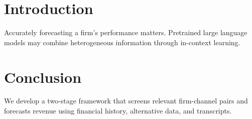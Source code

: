 \section{Introduction}
Accurately forecasting a firm's performance matters. Pretrained large language models may combine heterogeneous information through in-context learning.

\section{Conclusion}
We develop a two-stage framework that screens relevant firm-channel pairs and forecasts revenue using financial history, alternative data, and transcripts.
